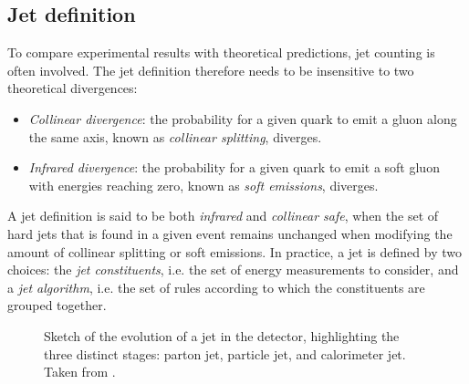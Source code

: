 \subsection{Jet definition}
To compare experimental results with theoretical predictions, jet counting is often involved. The jet definition therefore needs to be insensitive to two theoretical divergences:
\begin{itemize}
    \item \emph{Collinear divergence}: the probability for a given quark to emit a gluon along the same axis, known as \emph{collinear splitting}, diverges.
    \item \emph{Infrared divergence}: the probability for a given quark to emit a soft gluon with energies reaching zero, known as \emph{soft emissions}, diverges.
\end{itemize}
A jet definition is said to be both \emph{infrared} and \emph{collinear safe}, when the set of hard jets that is found in a given event remains unchanged when modifying the amount of collinear splitting or soft emissions.
In practice, a jet is defined by two choices: the \emph{jet constituents}, i.e. the set of energy measurements to consider, and a \emph{jet algorithm}, i.e. the set of rules according to which the constituents are grouped together.


\FloatBarrier
\begin{figure}
    \caption{Sketch of the evolution of a jet in the detector, highlighting the three distinct stages: parton jet, particle jet, and calorimeter jet. Taken from .}
    \label{fig:jet-evolution}
\end{figure}

